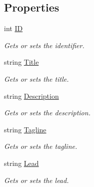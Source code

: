 \subsection*{Properties}
\begin{DoxyCompactItemize}
\item 
int \hyperlink{class_open_1_1_g_i_1_1hypermart_1_1_data_transformation_objects_1_1_product_d_t_o_ab965f0f2be3b04afb1de5e8fa97cd93a}{I\+D}
\begin{DoxyCompactList}\small\item\em Gets or sets the identifier. \end{DoxyCompactList}\item 
string \hyperlink{class_open_1_1_g_i_1_1hypermart_1_1_data_transformation_objects_1_1_product_d_t_o_a6f03b28697c295061d5c914d5598efef}{Title}
\begin{DoxyCompactList}\small\item\em Gets or sets the title. \end{DoxyCompactList}\item 
string \hyperlink{class_open_1_1_g_i_1_1hypermart_1_1_data_transformation_objects_1_1_product_d_t_o_a1de153f9a50688af8c97932d30056fef}{Description}
\begin{DoxyCompactList}\small\item\em Gets or sets the description. \end{DoxyCompactList}\item 
string \hyperlink{class_open_1_1_g_i_1_1hypermart_1_1_data_transformation_objects_1_1_product_d_t_o_a7b9cf190d3a304a72287dc1c0200aa94}{Tagline}
\begin{DoxyCompactList}\small\item\em Gets or sets the tagline. \end{DoxyCompactList}\item 
string \hyperlink{class_open_1_1_g_i_1_1hypermart_1_1_data_transformation_objects_1_1_product_d_t_o_a900af3a5017cf99ef7a51c8a496289cc}{Lead}
\begin{DoxyCompactList}\small\item\em Gets or sets the lead. \end{DoxyCompactList}\end{DoxyCompactItemize}


